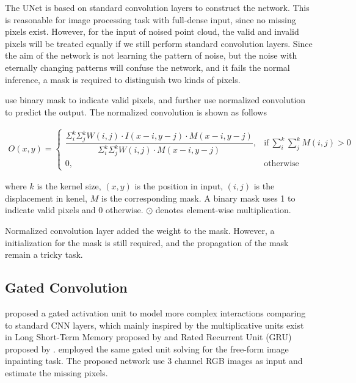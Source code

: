 The UNet is based on standard convolution layers to construct the network. This is reasonable for image processing task with full-dense input, since no missing pixels exist. 
However, for the input of noised point cloud, the valid and invalid pixels will be treated equally if we still perform standard convolution layers. Since the aim of the network is not learning the pattern of noise, but the noise with eternally changing patterns will confuse the network, and it fails the normal inference, a mask is required to distinguish two kinds of pixels. 

\cite{pncnn0} use binary mask to indicate valid pixels, and further use normalized convolution to predict the output. The normalized convolution is shown as follows

\begin{equation}
	\begin{array}{rrclcl}
		O(x,y) = 
		\begin{cases}
			\dfrac{\Sigma_i^k\Sigma_j^k W(i,j) \cdot I(x-i,y-j) \cdot M(x-i,y-j)}{\Sigma_i^k\Sigma_j^k W(i,j) \cdot M(x-i,y-j)}, & \text{if}\ \sum_{i}^k\sum_{j}^k M(i,j)>0 \\
			0, & \text{otherwise}
		\end{cases}
	\end{array}
\end{equation}

where $ k $ is the kernel size, $ (x,y) $ is the position in input, $ (i,j) $ is the displacement in kenel, $ M $ is the corresponding mask. A binary mask uses 1 to indicate valid pixels and 0 otherwise. $ \odot $ denotes element-wise multiplication.

Normalized convolution layer added the weight to the mask. However, a initialization for the mask is still required, and the propagation of the mask remain a tricky task. 

\subsection{Gated Convolution}

\cite{gated_activation} proposed a gated activation unit to model more complex interactions comparing to standard CNN layers, which mainly inspired by the multiplicative units exist in Long Short-Term Memory proposed by \cite{lstm} and Rated Recurrent Unit (GRU) proposed by \cite{gru}. 
\cite{gconv} employed the same gated unit solving for the free-form image inpainting task. The proposed network use 3 channel RGB images as input and estimate the missing pixels. 


